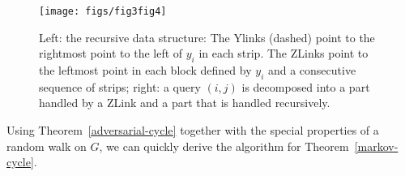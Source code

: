 \documentclass[oribibl,envcountsect,envcountsame]{llncs}
\begin{document}
\begin{figure}
\begin{center}
\texttt{[image: figs/fig3fig4]}
\end{center}
\caption{Left: the recursive data structure: The Ylinks (dashed) point
to the rightmost point to the left of $y_i$ in each strip.
The ZLinks point to the leftmost point in each block defined by
$y_i$ and a consecutive sequence of strips; right:
a query $(i,j)$ is decomposed into a part handled by
a ZLink and a part that is handled recursively. }
\label{fig:fig34}
\end{figure}




Using Theorem~\ref{adversarial-cycle} together
with the special properties of a random walk on $G$,
we can quickly derive the algorithm for Theorem~\ref{markov-cycle}.
\end{document}
